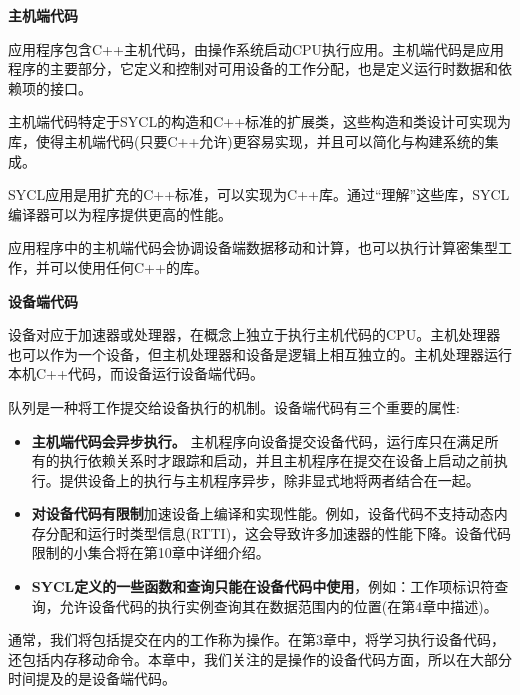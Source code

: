 \hspace*{\fill} \par %
\textbf{主机端代码}

应用程序包含C++主机代码，由操作系统启动CPU执行应用。主机端代码是应用程序的主要部分，它定义和控制对可用设备的工作分配，也是定义运行时数据和依赖项的接口。\par

主机端代码特定于SYCL的构造和C++标准的扩展类，这些构造和类设计可实现为库，使得主机端代码(只要C++允许)更容易实现，并且可以简化与构建系统的集成。\par

\begin{tcolorbox}[colback=red!5!white,colframe=red!75!black]
SYCL应用是用扩充的C++标准，可以实现为C++库。通过“理解”这些库，SYCL编译器可以为程序提供更高的性能。
\end{tcolorbox}

应用程序中的主机端代码会协调设备端数据移动和计算，也可以执行计算密集型工作，并可以使用任何C++的库。\par

\hspace*{\fill} \par %
\textbf{设备端代码}

设备对应于加速器或处理器，在概念上独立于执行主机代码的CPU。主机处理器也可以作为一个设备，但主机处理器和设备是逻辑上相互独立的。主机处理器运行本机C++代码，而设备运行设备端代码。\par

队列是一种将工作提交给设备执行的机制。设备端代码有三个重要的属性:\par

\begin{itemize}
	\item \textbf{主机端代码会异步执行。} 主机程序向设备提交设备代码，运行库只在满足所有的执行依赖关系时才跟踪和启动，并且主机程序在提交在设备上启动之前执行。提供设备上的执行与主机程序异步，除非显式地将两者结合在一起。
	\item \textbf{对设备代码有限制}加速设备上编译和实现性能。例如，设备代码不支持动态内存分配和运行时类型信息(RTTI)，这会导致许多加速器的性能下降。设备代码限制的小集合将在第10章中详细介绍。
	\item \textbf{SYCL定义的一些函数和查询只能在设备代码中使用}，例如：工作项标识符查询，允许设备代码的执行实例查询其在数据范围内的位置(在第4章中描述)。
\end{itemize}

通常，我们将包括提交在内的工作称为操作。在第3章中，将学习执行设备代码，还包括内存移动命令。本章中，我们关注的是操作的设备代码方面，所以在大部分时间提及的是设备端代码。\par


